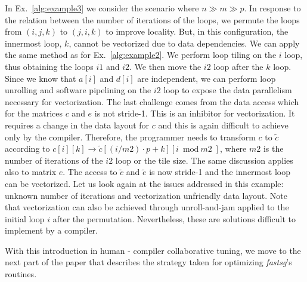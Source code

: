 In Ex.~\ref{alg:example3} we consider the scenario where $n \gg m \gg p$. In
response to the relation between the number of iterations of the loops, we
permute the loops from $(i,j,k)$ to $(j,i,k)$ to improve locality. But, in this
configuration, the innermost loop, $k$, cannot be vectorized due to data
dependencies. We can apply the same method as for Ex.~\ref{alg:example2}. We
perform loop tiling on the $i$ loop, thus obtaining the loops $\textit{i1}$ and
$\textit{i2}$. We then move the $\textit{i2}$ loop after the $k$ loop. Since we
know that $a[i]$ and $d[i]$ are independent, we can perform loop unrolling and
software pipelining on the $\textit{i2}$ loop to expose the data parallelism
necessary for vectorization. The last challenge comes from the data access which
for the matrices $c$ and $e$ is not stride-1. This is an inhibitor for
vectorization. It requires a change in the data layout for $c$ and this is again
difficult to achieve only by the compiler. Therefore, the programmer needs to
transform $c$ to $\tilde{c}$ according to $c[i][k] \rightarrow
\tilde{c}[(i/\textit{m2}) \cdot p + k][i \bmod \textit{m2}]$, where
$\textit{m2}$ is the number of iterations of the $\textit{i2}$ loop or the tile
size. The same discussion applies also to matrix $e$. The access to $\tilde{c}$
and $\tilde{e}$ is now stride-1 and the innermost loop can be vectorized. Let us
look again at the issues addressed in this example: unknown number of iterations
and vectorization unfriendly data layout. Note that vectorization can also be
achieved through unroll-and-jam applied to the initial loop $i$ after the
permutation. Nevertheless, these are solutions difficult to implement by a
compiler.

With this introduction in human - compiler collaborative tuning, we move to the
next part of the paper that describes the strategy taken for optimizing
\textit{fastsg}'s routines.
